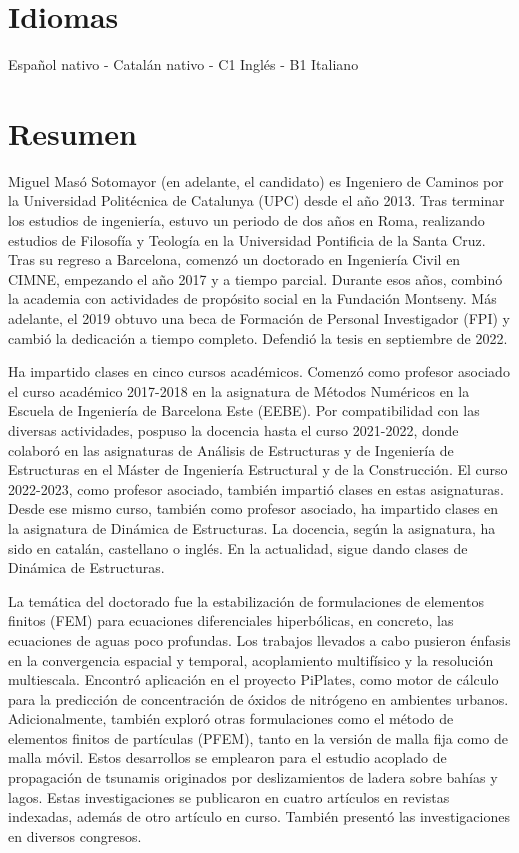 \documentclass[11pt]{article}
\begin{document}
\section{Idiomas}
Español nativo - Catalán nativo - C1 Inglés - B1 Italiano


\section{Resumen}
Miguel Masó Sotomayor (en adelante, el candidato) es Ingeniero de Caminos por la Universidad Politécnica de Catalunya (UPC) desde el año 2013. Tras terminar los estudios de ingeniería, estuvo un periodo de dos años en Roma, realizando estudios de Filosofía y Teología en la Universidad Pontificia de la Santa Cruz. Tras su regreso a Barcelona, comenzó un doctorado en Ingeniería Civil en CIMNE, empezando el año 2017 y a tiempo parcial. Durante esos años, combinó la academia con actividades de propósito social en la Fundación Montseny. Más adelante, el 2019 obtuvo una beca de Formación de Personal Investigador (FPI) y cambió la dedicación a tiempo completo. Defendió la tesis en septiembre de 2022.

Ha impartido clases en cinco cursos académicos. Comenzó como profesor asociado el curso académico 2017-2018 en la asignatura de Métodos Numéricos en la Escuela de Ingeniería de Barcelona Este (EEBE). Por compatibilidad con las diversas actividades, pospuso la docencia hasta el curso 2021-2022, donde colaboró en las asignaturas de Análisis de Estructuras y de Ingeniería de Estructuras en el Máster de Ingeniería Estructural y de la Construcción. El curso 2022-2023, como profesor asociado, también impartió clases en estas asignaturas. Desde ese mismo curso, también como profesor asociado, ha impartido clases en la asignatura de Dinámica de Estructuras. La docencia, según la asignatura, ha sido en catalán, castellano o inglés. En la actualidad, sigue dando clases de Dinámica de Estructuras.

La temática del doctorado fue la estabilización de formulaciones de elementos finitos (FEM) para ecuaciones diferenciales hiperbólicas, en concreto, las ecuaciones de aguas poco profundas. Los trabajos llevados a cabo pusieron énfasis en la convergencia espacial y temporal, acoplamiento multifísico y la resolución multiescala. Encontró aplicación en el proyecto PiPlates, como motor de cálculo para la predicción de concentración de óxidos de nitrógeno en ambientes urbanos. Adicionalmente, también exploró otras formulaciones como el método de elementos finitos de partículas (PFEM), tanto en la versión de malla fija como de malla móvil. Estos desarrollos se emplearon para el estudio acoplado de propagación de tsunamis originados por deslizamientos de ladera sobre bahías y lagos. Estas investigaciones se publicaron en cuatro artículos en revistas indexadas, además de otro artículo en curso. También presentó las investigaciones en diversos congresos.
\end{document}

